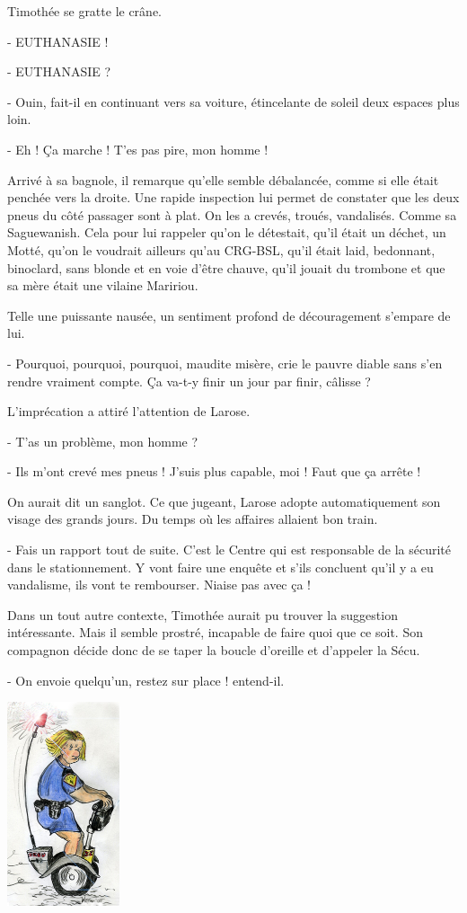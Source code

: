 Timothée se gratte le crâne.

- EUTHANASIE !

- EUTHANASIE ?

- Ouin, fait-il en continuant vers sa voiture, étincelante de soleil deux espaces plus loin.

- Eh ! Ça marche ! T’es pas pire, mon homme !

Arrivé à sa bagnole, il remarque qu’elle semble débalancée, comme si elle était penchée vers la droite. Une rapide inspection lui permet de constater que les deux pneus du côté passager sont à plat. On les a crevés, troués, vandalisés. Comme sa Saguewanish. Cela pour lui rappeler qu’on le détestait, qu’il était un déchet, un Motté, qu’on le voudrait ailleurs qu’au CRG-BSL, qu’il était laid, bedonnant, binoclard, sans blonde et en voie d’être chauve, qu’il jouait du trombone et que sa mère était une vilaine Maririou.

Telle une puissante nausée, un sentiment profond de découragement s’empare de lui.

- Pourquoi, pourquoi, pourquoi, maudite misère, crie le pauvre diable sans s’en rendre vraiment compte. Ça va-t-y finir un jour par finir, câlisse ?

L’imprécation a attiré l’attention de Larose.

- T’as un problème, mon homme ?

- Ils m’ont crevé mes pneus ! J’suis plus capable, moi ! Faut que ça arrête !

On aurait dit un sanglot. Ce que jugeant, Larose adopte automatiquement son visage des grands jours. Du temps où les affaires allaient bon train.

- Fais un rapport tout de suite. C’est le Centre qui est responsable de la sécurité dans le stationnement. Y vont faire une enquête et s’ils concluent qu’il y a eu vandalisme, ils vont te rembourser. Niaise pas avec ça !

Dans un tout autre contexte, Timothée aurait pu trouver la suggestion intéressante. Mais il semble prostré, incapable de faire quoi que ce soit. Son compagnon décide donc de se taper la boucle d’oreille et d’appeler la Sécu.

- On envoie quelqu’un, restez sur place ! entend-il.

\begin{floatingfigure}[l]{40mm}
\includegraphics[height=60mm]{corps/chapitre8/img/personnage-marie-odile.jpg}
\end{floatingfigure}

